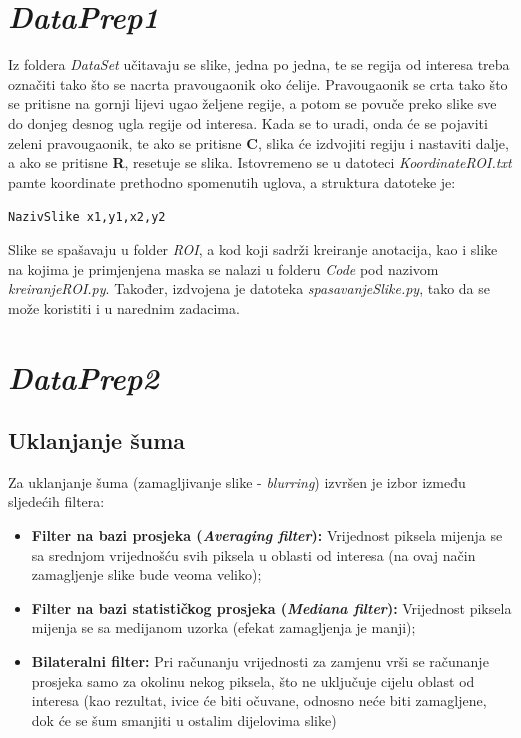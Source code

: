 \documentclass[12pt,a4paper]{article}
\begin{document}
\newpage

\section{\textit{DataPrep1}}

Iz foldera \textit{DataSet} učitavaju se slike, jedna po jedna, te se regija od interesa treba označiti tako što se nacrta pravougaonik oko ćelije. Pravougaonik se crta tako što se pritisne na gornji lijevi ugao željene regije, a potom se povuče preko slike sve do donjeg desnog ugla regije od interesa. Kada se to uradi, onda će se pojaviti zeleni pravougaonik, te ako se pritisne \textbf{C}, slika će izdvojiti regiju i nastaviti dalje, a ako se pritisne \textbf{R}, resetuje se slika. Istovremeno se u datoteci \textit{KoordinateROI.txt} pamte koordinate prethodno spomenutih uglova, a struktura datoteke je:

\begin{center}

\texttt{NazivSlike x1,y1,x2,y2}

\end{center}

Slike se spašavaju u folder \textit{ROI}, a kod koji sadrži kreiranje anotacija, kao i slike na kojima je primjenjena maska se nalazi u folderu \textit{Code} pod nazivom \textit{kreiranjeROI.py}. Također, izdvojena je datoteka \textit{spasavanjeSlike.py}, tako da se može koristiti i u narednim zadacima.

\newpage

\section{\textit{DataPrep2}}

\subsection{Uklanjanje šuma}

Za uklanjanje šuma (zamagljivanje slike - \textit{blurring}) izvršen je izbor između sljedećih filtera:

\begin{itemize}

\item \textbf{Filter na bazi prosjeka (\textit{Averaging filter}):} Vrijednost piksela mijenja se sa srednjom vrijednošću svih piksela u oblasti od interesa (na ovaj način zamagljenje slike bude veoma veliko); 
\item \textbf{Filter na bazi statističkog prosjeka (\textit{Mediana filter}):} Vrijednost piksela mijenja se sa medijanom uzorka (efekat zamagljenja je manji);
\item \textbf{Bilateralni filter:} Pri računanju vrijednosti za zamjenu vrši se računanje prosjeka samo za okolinu nekog piksela, što ne uključuje cijelu oblast od interesa (kao rezultat, ivice će biti očuvane, odnosno neće biti zamagljene, dok će se šum smanjiti u ostalim dijelovima slike)

\end{itemize}
\end{document}
